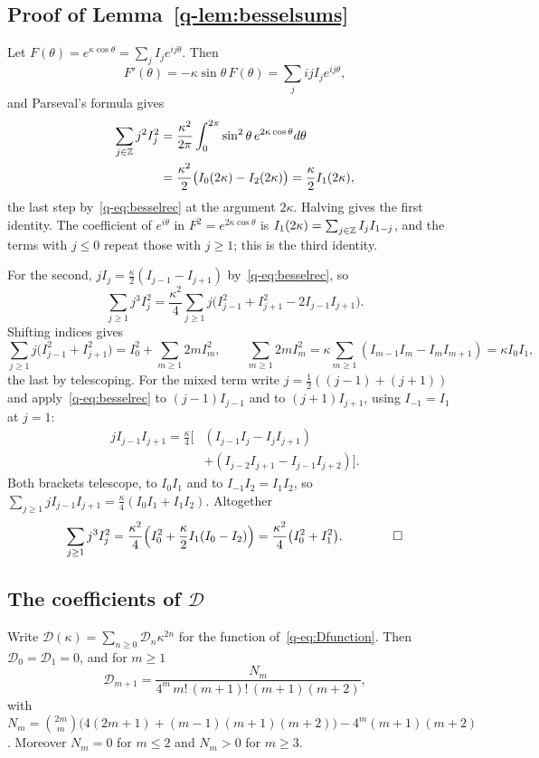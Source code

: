 \subsection{Proof of Lemma~\ref{q-lem:besselsums}}

Let $F(\theta)=e^{\kappa\cos\theta}=\sum_jI_je^{ij\theta}$. Then
\[
F'(\theta)=-\kappa\sin\theta\,F(\theta)=\sum_jijI_je^{ij\theta},
\]
and Parseval's formula gives
\[
\begin{aligned}
\sum_{j\in\mathbb{Z}}j^2I_j^2&=\frac{\kappa^2}{2\pi}\int_0^{2\pi}\sin^2\theta\,
e^{2\kappa\cos\theta}d\theta\\
&=\frac{\kappa^2}2\bigl(I_0(2\kappa)-I_2(2\kappa)\bigr)=\frac\kappa2I_1(2\kappa),
\end{aligned}
\]
the last step by~\eqref{q-eq:besselrec} at the argument $2\kappa$. Halving gives
the first identity. The coefficient of $e^{i\theta}$ in $F^2=e^{2\kappa\cos
\theta}$ is $I_1(2\kappa)=\sum_{j\in\mathbb{Z}}I_jI_{1-j}$, and the terms with $j\le0$
repeat those with $j\ge1$; this is the third identity.

For the second, $jI_j=\frac\kappa2(I_{j-1}-I_{j+1})$ by~\eqref{q-eq:besselrec}, so
\[
\sum_{j\ge1}j^3I_j^2=\frac{\kappa^2}4\sum_{j\ge1}j\bigl(I_{j-1}^2+I_{j+1}^2-
2I_{j-1}I_{j+1}\bigr).
\]
Shifting indices gives
\[
\sum_{j\ge1}j\bigl(I_{j-1}^2+I_{j+1}^2\bigr)=I_0^2+\sum_{m\ge1}2mI_m^2,
\qquad
\sum_{m\ge1}2mI_m^2=\kappa\sum_{m\ge1}(I_{m-1}I_m-I_mI_{m+1})=\kappa I_0I_1,
\]
the last by telescoping. For the mixed term write $j=\frac12((j-1)+(j+1))$
and apply~\eqref{q-eq:besselrec} to $(j-1)I_{j-1}$ and to $(j+1)I_{j+1}$,
using $I_{-1}=I_1$ at $j=1$:
\[
\begin{aligned}
jI_{j-1}I_{j+1}=\frac\kappa4\bigl[&(I_{j-1}I_j-I_jI_{j+1})\\
&+(I_{j-2}I_{j+1}-I_{j-1}I_{j+2})\bigr].
\end{aligned}
\]
Both brackets telescope, to $I_0I_1$ and to $I_{-1}I_2=I_1I_2$, so
$\sum_{j\ge1}jI_{j-1}I_{j+1}=\frac\kappa4(I_0I_1+I_1I_2)$. Altogether
\[
\sum_{j\ge1}j^3I_j^2=\frac{\kappa^2}4\Bigl(I_0^2+\frac\kappa2I_1(I_0-I_2)
\Bigr)=\frac{\kappa^2}4\bigl(I_0^2+I_1^2\bigr). \qquad\qed
\]

\subsection{\texorpdfstring{The coefficients of $\mathcal D$}{The coefficients of D}}

\begin{lemma}\label{q-lem:Dcoef}
Write $\mathcal D(\kappa)=\sum_{n\ge0}\mathcal D_n\kappa^{2n}$ for the function
of~\eqref{q-eq:Dfunction}. Then $\mathcal D_0=\mathcal D_1=0$, and for $m\ge1$
\[
\mathcal D_{m+1}=\frac{N_m}{4^m\,m!\,(m+1)!\,(m+1)(m+2)},
\]
with $N_m=\binom{2m}m\bigl(4(2m+1)+(m-1)(m+1)(m+2)\bigr)-4^m(m+1)(m+2)$.
Moreover $N_m=0$ for $m\le2$ and $N_m>0$ for $m\ge3$.
\end{lemma}

